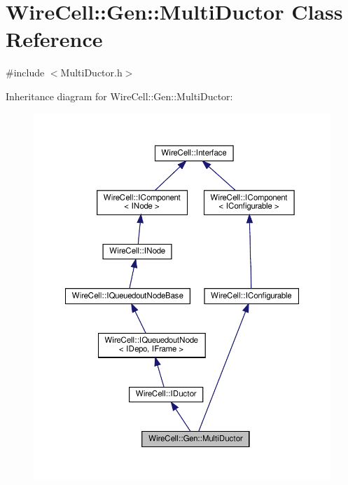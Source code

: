 \hypertarget{class_wire_cell_1_1_gen_1_1_multi_ductor}{}\section{Wire\+Cell\+:\+:Gen\+:\+:Multi\+Ductor Class Reference}
\label{class_wire_cell_1_1_gen_1_1_multi_ductor}


{\ttfamily \#include $<$Multi\+Ductor.\+h$>$}



Inheritance diagram for Wire\+Cell\+:\+:Gen\+:\+:Multi\+Ductor\+:
\nopagebreak
\begin{figure}[H]
\begin{center}
\leavevmode
\includegraphics[width=350pt]{class_wire_cell_1_1_gen_1_1_multi_ductor__inherit__graph}
\end{center}
\end{figure}


